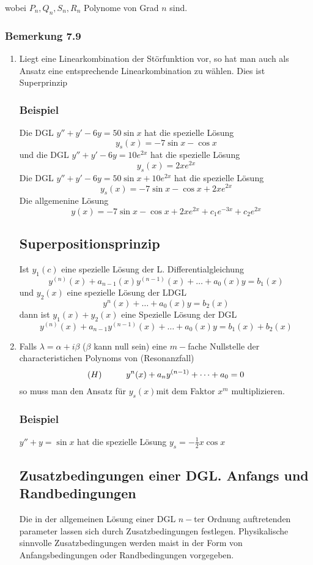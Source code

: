 wobei $P_n,Q_n,S_n,R_n$ Polynome von Grad $n$ sind.
\subsubsection*{Bemerkung 7.9}
\begin{enumerate}
\item {}Liegt eine Linearkombination der Störfunktion vor, so hat man auch als Ansatz eine entsprechende Linearkombination zu wählen. Dies ist Superprinzip
\subsubsection*{Beispiel}
Die DGL $y''+y'-6y=50\sin x$ hat die spezielle Lösung $$y_s(x)=-7\sin x-\cos x$$ und die DGL $y''+y'-6y=10e^{2x}$ hat die spezielle Lösung $$y_s(x)=2xe^{2x}$$Die DGL $y''+y'-6y=50\sin x+10e^{2x}$ hat die spezielle Lösung $$y_s(x)=-7\sin x-\cos x+2xe^{2x}$$ Die allgemenine Lösung $$y(x)=-7\sin x -\cos x+2xe^{2x}+c_1e^{-3x}+c_2e^{2x}$$
\subsection*{Superpositionsprinzip}
Ist $y_1(c)$ eine spezielle Lösung der L. Differentialgleichung $$y^{(n)}(x)+a_{n-1}(x)y^{(n-1)}(x)+\dots +a_0(x)y=b_1(x)$$ und $y_2(x)$ eine spezielle Lösung der LDGL $$y^n(x)+\dots +a_0(x)y=b_2(x)$$ dann ist $y_1(x)+y_2(x)$ eine Spezielle Lösung der DGL $$y^{(n)}(x)+a_{n-1}y^{(n-1)}(x)+\dots+a_0(x)y=b_1(x)+b_2(x)$$
\item Falls $\lambda=\alpha +i\beta$ ($\beta$ kann null sein) eine $m-$fache Nullstelle der characteristichen Polynoms von (Resonanzfall) $$(H)\hspace{10mm}y^n(x)+a_ny^{(n-1)}+\dots +a_0=0$$so muss man den Ansatz für $y_s(x)$mit dem Faktor $x^m$ multiplizieren.
\subsubsection*{Beispiel}
$y''+y=\sin x$ hat die spezielle Lösung $y_s=-\frac{1}{2}x\cos x$
\subsection*{Zusatzbedingungen einer DGL. Anfangs und Randbedingungen}
Die in der allgemeinen Lösung einer DGL $n-$ter Ordnung auftretenden parameter lassen sich durch Zusatzbedingungen festlegen. Physikalische sinnvolle Zusatzbedingungen werden maist in der Form von Anfangsbedingungen oder Randbedingungen vorgegeben. \\


\end{enumerate}
